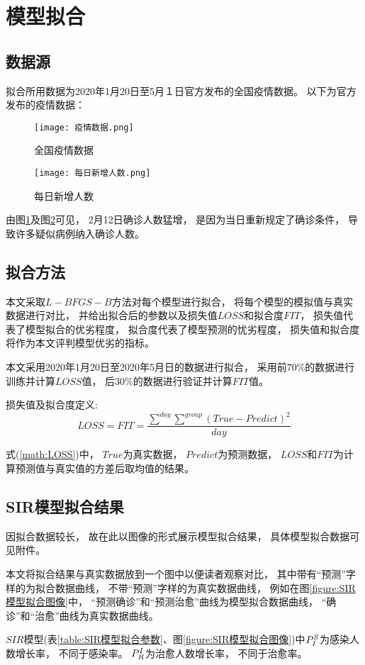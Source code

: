\section{模型拟合}
\subsection{数据源}
\par 拟合所用数据为2020年1月20日至5月１日官方发布的全国疫情数据。
以下为官方发布的疫情数据：
\begin{figure}[H]
    \centering
    \texttt{[image: 疫情数据.png]}
    \caption{全国疫情数据\label{figure:全国疫情数据}}
\end{figure}
\begin{figure}[H]
    \centering
    \texttt{[image: 每日新增人数.png]}
    \caption{每日新增人数\label{figure:每日新增人数}}
\end{figure}
\par
由图\ref{figure:全国疫情数据}及图\ref{figure:每日新增人数}可见，
2月12日确诊人数猛增，
是因为当日重新规定了确诊条件，
导致许多疑似病例纳入确诊人数。
\subsection{拟合方法}
\par 本文采取$L-BFGS-B$方法对每个模型进行拟合，
将每个模型的模拟值与真实数据进行对比，
并给出拟合后的参数以及损失值$LOSS$和拟合度$FIT$，
损失值代表了模型拟合的优劣程度，
拟合度代表了模型预测的忧劣程度，
损失值和拟合度将作为本文评判模型优劣的指标。
\par 本文采用2020年1月20日至2020年5月日的数据进行拟合，
采用前$70\%$的数据进行训练并计算$LOSS$值，
后$30\%$的数据进行验证并计算$FIT$值。
\par 损失值及拟合度定义:
\begin{equation}
    LOSS= FIT = \frac{\sum\limits^{day}\sum\limits^{group}
        (True-Predict)^2}{day}
    \label{math:LOSS}
\end{equation}
\par 式(\ref{math:LOSS})中，
$True$为真实数据，
$Predict$为预测数据，
$LOSS$和$FIT$为计算预测值与真实值的方差后取均值的结果。
\subsection{SIR模型拟合结果}
\par 因拟合数据较长，
故在此以图像的形式展示模型拟合结果，
具体模型拟合数据可见附件。
\par 本文将拟合结果与真实数据放到一个图中以便读者观察对比，
其中带有“预测”字样的为拟合数据曲线，
不带“预测”字样的为真实数据曲线，
例如在图\ref{figure:SIR模型拟合图像}中，
“预测确诊”和“预测治愈”曲线为模型拟合数据曲线，
“确诊”和“治愈”曲线为真实数据曲线。
\par $SIR$模型(表\ref{table:SIR模型拟合参数}、图\ref{figure:SIR模型拟合图像})中$\P{S}{I}$为感染人数增长率，
不同于感染率。
$\P{I}{R}$为治愈人数增长率，
不同于治愈率。
